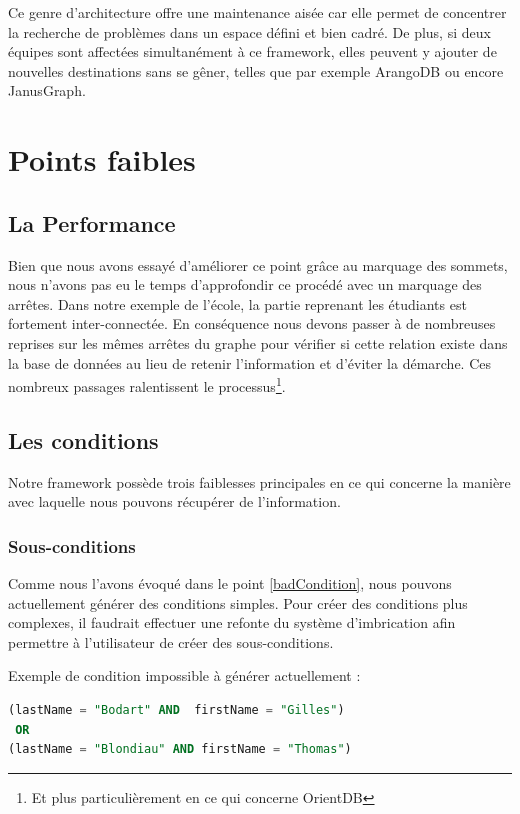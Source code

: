 \documentclass[a4paper,fleqn,12pt]{report}
\begin{document}
Ce genre d'architecture offre une maintenance aisée car elle permet de concentrer la recherche de problèmes dans un espace défini et bien cadré. De plus, si deux équipes sont affectées simultanément à ce framework, elles peuvent y ajouter de nouvelles destinations sans se gêner, telles que par exemple ArangoDB\cite{arangoSite} ou encore JanusGraph\cite{janusGraphSite}. 


\section{Points faibles}
\subsection{La Performance}

Bien que nous avons essayé d'améliorer ce point grâce au marquage des sommets, nous n'avons pas eu le temps d'approfondir ce procédé avec un marquage des arrêtes. Dans notre exemple de l'école, la partie reprenant les étudiants est fortement inter-connectée. En conséquence nous devons passer à de nombreuses reprises sur les mêmes arrêtes du graphe pour vérifier si cette relation existe dans la base de données au lieu de retenir l'information et d'éviter la démarche. Ces nombreux passages ralentissent le processus\footnote{Et plus particulièrement en ce qui concerne OrientDB}.

\subsection{Les conditions}

Notre framework possède trois faiblesses principales en ce qui concerne la manière avec laquelle nous pouvons récupérer de l'information.

\subsubsection*{\bf Sous-conditions}

Comme nous l'avons évoqué dans le point \ref{badCondition}, nous pouvons actuellement générer des conditions simples.
Pour créer des conditions plus complexes, il faudrait effectuer une refonte du système d'imbrication afin permettre à l'utilisateur de créer des sous-conditions. 

Exemple de condition impossible à générer actuellement :
\begin{lstlisting}[language=SQL]
(lastName = "Bodart" AND  firstName = "Gilles") 
 OR 
(lastName = "Blondiau" AND firstName = "Thomas")
\end{lstlisting}
\end{document}
